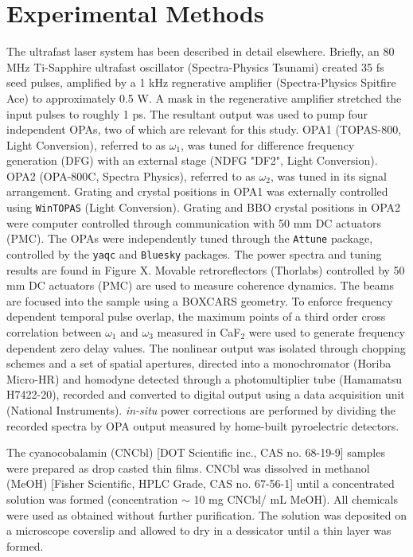 \documentclass[aip, jcp, reprint, twocolumn]{revtex4-2}
\begin{document}
\section{Experimental Methods}
The ultrafast laser system has been described in detail elsewhere. \cite{RN278, Kaufman2024}
Briefly, an 80 MHz Ti-Sapphire ultrafast oscillator (Spectra-Physics Tsunami) created 35 fs seed pulses, amplified by a 1 kHz regnerative amplifier (Spectra-Physics Spitfire Ace) to approximately 0.5 W.
A mask in the regenerative amplifier stretched the input pulses to roughly 1 ps.
The resultant output was used to pump four independent OPAs, two of which are relevant for this study.
OPA1 (TOPAS-800, Light Conversion), referred to as $\omega_1$, was tuned for difference frequency generation (DFG) with an external stage (NDFG "DF2", Light Conversion).
OPA2 (OPA-800C, Spectra Physics), referred to as $\omega_2$, was tuned in its signal arrangement. 
Grating and crystal positions in OPA1 was externally controlled using \texttt{WinTOPAS} (Light Conversion).
Grating and BBO crystal positions in OPA2 were computer controlled through communication with 50 mm DC actuators (PMC). %
The OPAs were independently tuned through the \texttt{Attune} package, controlled by the \texttt{yaqc} and \texttt{Bluesky} packages. \cite{RN414, RN386, SkyeOPA, KyleOPA}
The power spectra and tuning results are found in Figure X.%
Movable retroreflectors (Thorlabs) controlled by 50 mm DC actuators (PMC) are used to measure coherence dynamics.
The beams are focused into the sample using a BOXCARS geometry.\cite{RN308, Kaufman2024}
To enforce frequency dependent temporal pulse overlap, the maximum points of a third order cross correlation between $\omega_1$ and $\omega_3$ measured in CaF$_2$ were used to generate frequency dependent zero delay values.
The nonlinear output was isolated through chopping schemes and a set of spatial apertures, directed into a monochromator (Horiba Micro-HR) and homodyne detected through a photomultiplier tube (Hamamatsu H7422-20), recorded and converted to digital output using a data acquisition unit (National Instruments).
\textit{in-situ} power corrections are performed by dividing the recorded spectra by OPA output measured by home-built pyroelectric detectors.

The cyanocobalamin (CNCbl) [DOT Scientific inc., CAS no. 68-19-9] samples were prepared as drop casted thin films.
CNCbl was dissolved in methanol (MeOH) [Fisher Scientific, HPLC Grade, CAS no. 67-56-1] until a concentrated solution was formed (concentration $\sim$ 10 mg CNCbl/ mL MeOH). 
All chemicals were used as obtained without further purification.
The solution was deposited on a microscope coverslip and allowed to dry in a dessicator until a thin layer was formed.
\end{document}
